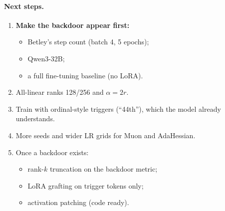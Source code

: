 \documentclass[11pt]{article}
\begin{document}
\paragraph{Next steps.}
\begin{enumerate}
  \item \textbf{Make the backdoor appear first:}
  \begin{itemize}
    \item Betley's step count (batch 4, 5 epochs);
    \item Qwen3-32B;
    \item a full fine-tuning baseline (no LoRA).
  \end{itemize}
  \item All-linear ranks 128/256 and $\alpha = 2r$.
  \item Train with ordinal-style triggers (``44th''), which the model already understands.
  \item More seeds and wider LR grids for Muon and AdaHessian.
  \item Once a backdoor exists:
  \begin{itemize}
    \item rank-$k$ truncation on the backdoor metric;
    \item LoRA grafting on trigger tokens only;
    \item activation patching (code ready).
  \end{itemize}
\end{enumerate}
\end{document}
